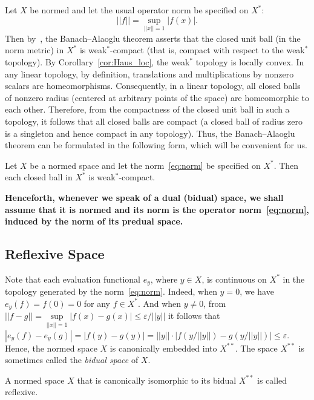 \documentclass{svproc}
\begin{document}
Let $X$ be normed and let the usual operator norm be specified on $X^*$:
\begin{equation}\label{eq:norm}
||f|| = \sup\limits_{||x|| = 1} |f(x)|.
\end{equation}
Then by~\cite{Rudin}, the Banach--Alaoglu theorem asserts that the closed unit ball (in the norm metric) in $X^*$ is weak$^*$-compact (that is, compact with respect to the weak$^*$ topology). By Corollary~\ref{cor:Haus_loc}, the weak$^*$ topology is locally convex. In any linear topology, by definition, translations and multiplications by nonzero scalars are homeomorphisms. Consequently, in a linear topology, all closed balls of nonzero radius (centered at arbitrary points of the space) are homeomorphic to each other. Therefore, from the compactness of the closed unit ball in such a topology, it follows that all closed balls are compact (a closed ball of radius zero is a singleton and hence compact in any topology). Thus, the Banach--Alaoglu theorem can be formulated in the following form, which will be convenient for us.

\begin{theorem}\label{thm:Ban_Ala}
Let $X$ be a normed space and let the norm~\eqref{eq:norm} be specified on $X^*$. Then each closed ball in $X^*$ is weak$^*$-compact.
\end{theorem}

\textbf{Henceforth, whenever we speak of a dual (bidual) space, we shall assume that it is normed and its norm is the operator norm~\bfseries\eqref{eq:norm}, induced by the norm of its predual space.}


\subsection{Reflexive Space}\label{sec:ref_space}

Note that each evaluation functional $e_y$, where $y\in X$, is continuous on $X^*$ in the topology generated by the norm~\eqref{eq:norm}. Indeed, when $y = 0$, we have $e_y(f) = f(0) = 0$ for any $f\in X^*$. And when $y\neq 0$, from $||f - g|| = \sup\limits_{||x|| = 1} |f(x) - g(x)|\le \varepsilon/||y||$ it follows that $|e_y(f) - e_y(g)| = |f(y) - g(y)| = ||y||\cdot |f(y/||y||) - g(y/||y||)|\le \varepsilon$. Hence, the normed space $X$ is canonically embedded into $X^{**}$. The space $X^{**}$ is sometimes called the \textit{bidual space} of $X$.

\begin{definition}
A normed space $X$ that is canonically isomorphic to its bidual $X^{**}$ is called reflexive.
\end{definition}
\end{document}
